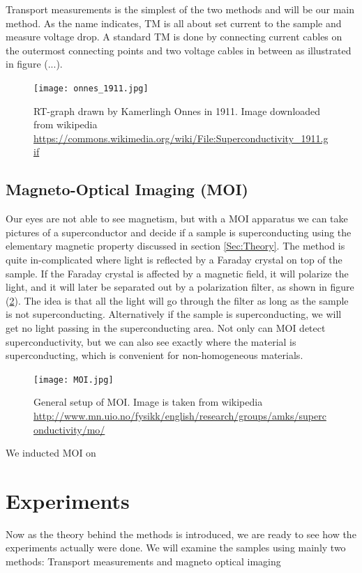 \documentclass{comjnl}
\begin{document}
Transport measurements is the simplest of the two methods and will be our main method. As the name indicates, TM is all about set current to the sample and measure voltage drop. A standard TM is done by connecting current cables on the outermost connecting points and two voltage cables in between as illustrated in figure (...). 

\begin{figure}[h]
\centering
\texttt{[image: onnes\_1911.jpg]}
\caption{RT-graph drawn by Kamerlingh Onnes in 1911. Image downloaded from wikipedia \url{https://commons.wikimedia.org/wiki/File:Superconductivity_1911.gif} \label{fig:onnes_1911}}
\end{figure}

\subsection{Magneto-Optical Imaging (MOI)}
Our eyes are not able to see magnetism, but with a MOI apparatus we can take pictures of a superconductor and decide if a sample is superconducting using the elementary magnetic property discussed in section \ref{Sec:Theory}. The method is quite in-complicated where light is reflected by a Faraday crystal on top of the sample. If the Faraday crystal is affected by a magnetic field, it will polarize the light, and it will later be separated out by a polarization filter, as shown in figure (\ref{fig:MOI}). The idea is that all the light will go through the filter as long as the sample is not superconducting. Alternatively if the sample is superconducting, we will get no light passing in the superconducting area. Not only can MOI detect superconductivity, but we can also see exactly where the material is superconducting, which is convenient for non-homogeneous materials. 
\begin{figure}[h]
\centering
\texttt{[image: MOI.jpg]}
\caption{General setup of MOI. Image is taken from wikipedia \url{http://www.mn.uio.no/fysikk/english/research/groups/amks/superconductivity/mo/} \label{fig:MOI}}
\end{figure}
We inducted MOI on 

\section{Experiments}\label{Sec:Experiments}
Now as the theory behind the methods is introduced, we are ready to see how the experiments actually were done. 
We will examine the samples using mainly two methods: Transport measurements and magneto optical imaging
\end{document}
